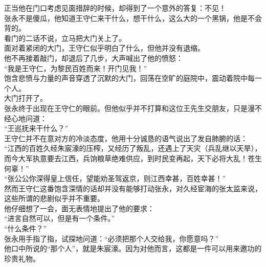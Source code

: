 \begin{multicols}{\theparacolNo}
正当他在门口考虑见面措辞的时候，却得到了一个意外的答复：不见！\\

张永不是傻瓜，他知道王守仁来干什么，想干什么，这么大的一个黑锅，他是不会背的。\\

看门的二话不说，立马把大门关上了。\\

面对着紧闭的大门，王守仁似乎明白了什么，但他并没有退缩。\\

他不再接着敲门，却退后了几步，大声喊出了他的愤怒：\\

“我是王守仁，为黎民百姓而来！开门见我！”\\

饱含悲愤与力量的声音穿透了沉默的大门，回荡在空旷的庭院中，震动着院中每一个人。\\

大门打开了。\\

张永终于出现在王守仁的眼前。但他似乎并不打算和这位王先生交朋友，只是漫不经心地问道：\\

“王巡抚来干什么？”\\

王守仁并不在意对方的冷淡态度，他用十分诚恳的语气说出了发自肺腑的话：\\

“江西的百姓久经朱宸濠的压榨，又经历了叛乱，还遇上了天灾（兵乱继以天旱），而今大军执意要去江西，兵饷粮草绝难供应，到时民变再起，天下必将大乱！苍生何辜！”\\

“张公公你深得皇上信任，望能劝圣驾返京，则江西幸甚，百姓幸甚！”\\

然而王守仁这番饱含深情的话却并没有能够打动张永，对久经宦海的张太监来说，这些所谓的悲剧似乎并不重要。\\

他仔细想了一会，面无表情地提出了他的要求：\\

“进言自然可以，但是有一个条件。”\\

“什么条件？”\\

张永用手指了指，试探地问道：“必须把那个人交给我，你愿意吗？”\\

他口中所说的“那个人”，就是朱宸濠。因为对他而言，这都是一件可以用来邀功的珍贵礼物。\\


\end{multicols}
